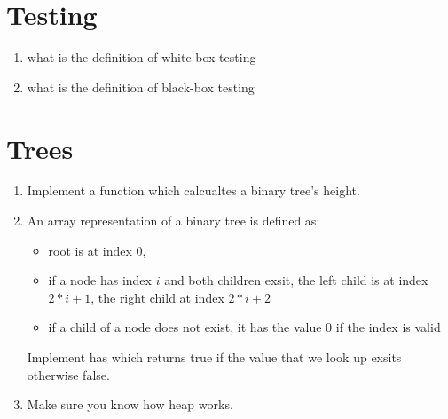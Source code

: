 \documentclass[12pt]{article}
\begin{document}
\section{Testing}
\begin{enumerate}
    \item what is the definition of white-box testing
    \item what is the definition of black-box testing
\end{enumerate}


\section{Trees}
\begin{enumerate}
    \item Implement a function which calcualtes a binary tree's height.
    \item An array representation of a binary tree is defined as:
    \begin{itemize}
        \item root is at index 0,
        \item if a node has index $i$ and both children exsit, the left child is at index $2 * i + 1$, 
        the right child at index $2 * i + 2$
        \item if a child of a node does not exist, it has the value 0 if the index is valid
    \end{itemize}
    Implement has which returns true if the value that we look up exsits otherwise false. 
    \item Make sure you know how heap works. 
\end{enumerate}
\end{document}
